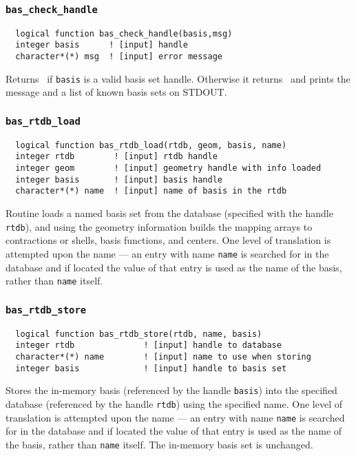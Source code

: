 \subsubsection{{\tt bas\_check\_handle}}
\begin{verbatim}
  logical function bas_check_handle(basis,msg)
  integer basis      ! [input] handle
  character*(*) msg  ! [input] error message
\end{verbatim}
Returns \TRUE\ if {\tt basis} is a valid basis set handle.  Otherwise
it returns \FALSE\ and prints the message and a list of known basis
sets on STDOUT.

\subsubsection{{\tt bas\_rtdb\_load}}
\begin{verbatim}
  logical function bas_rtdb_load(rtdb, geom, basis, name)
  integer rtdb        ! [input] rtdb handle      
  integer geom        ! [input] geometry handle with info loaded
  integer basis       ! [input] basis handle
  character*(*) name  ! [input] name of basis in the rtdb
\end{verbatim}
Routine loads a named basis set from the database (specified with the
handle {\tt rtdb}), and using the geometry information builds the
mapping arrays to contractions or shells, basis functions, and
centers.  One level of translation is attempted upon the name --- an
entry with name {\tt name} is searched for in the database and if
located the value of that entry is used as the name of the basis,
rather than {\tt name} itself.

\subsubsection{{\tt bas\_rtdb\_store}}
\begin{verbatim}
  logical function bas_rtdb_store(rtdb, name, basis)
  integer rtdb              ! [input] handle to database
  character*(*) name        ! [input] name to use when storing
  integer basis             ! [input] handle to basis set
\end{verbatim}
Stores the in-memory basis (referenced by the handle {\tt basis}) into
the specified database (referenced by the handle {\tt rtdb}) using the
specified name.  One level of translation is attempted upon the name
--- an entry with name {\tt name} is searched for in the database and
if located the value of that entry is used as the name of the basis,
rather than {\tt name} itself.  The in-memory basis set is unchanged.

